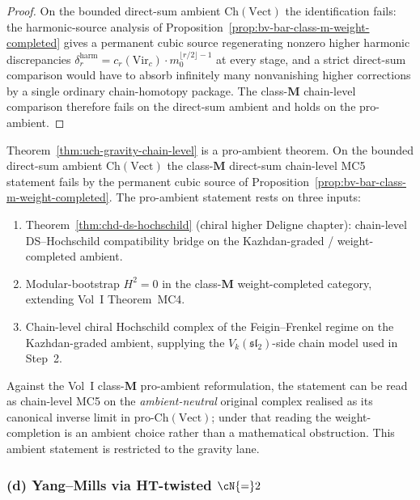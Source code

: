 \begin{proof}
On the bounded direct-sum ambient $\mathrm{Ch}(\mathrm{Vect})$ the
identification fails: the harmonic-source analysis of
Proposition~\ref{prop:bv-bar-class-m-weight-completed} gives a
permanent cubic source regenerating nonzero higher harmonic
discrepancies $\delta_r^{\mathrm{harm}} =
c_r(\mathrm{Vir}_c) \cdot m_0^{\lfloor r/2 \rfloor - 1}$ at every
stage, and a strict direct-sum comparison would have to absorb
infinitely many nonvanishing higher corrections by a single ordinary
chain-homotopy package. The class-$\mathbf M$ chain-level comparison
therefore fails on the direct-sum ambient and holds on the
pro-ambient.
\end{proof}

\begin{remark}
\label{rem:uch-gravity-chain-level-promotion}
Theorem~\ref{thm:uch-gravity-chain-level} is a pro-ambient theorem.
On the bounded direct-sum ambient $\mathrm{Ch}(\mathrm{Vect})$ the
class-$\mathbf M$ direct-sum chain-level MC5 statement fails by the
permanent cubic source of
Proposition~\ref{prop:bv-bar-class-m-weight-completed}. The
pro-ambient statement rests on three inputs:
\begin{enumerate}
\item Theorem~\ref{thm:chd-ds-hochschild} (chiral higher Deligne
chapter): chain-level DS--Hochschild compatibility bridge on the
Kazhdan-graded / weight-completed ambient.
\item Modular-bootstrap $H^2 = 0$ in the class-$\mathbf M$
weight-completed category, extending Vol~I Theorem~MC4.
\item Chain-level chiral Hochschild complex of the Feigin--Frenkel
regime on the Kazhdan-graded ambient, supplying the
$V_k(\mathfrak{sl}_2)$-side chain model used in Step~2.
\end{enumerate}
Against the Vol~I class-$\mathbf M$ pro-ambient reformulation, the
statement can be read as chain-level MC5 on the
\emph{ambient-neutral} original complex realised as its canonical
inverse limit in
$\mathrm{pro}\text{-}\mathrm{Ch}(\mathrm{Vect})$; under that reading
the weight-completion is an ambient choice rather than a mathematical
obstruction. This ambient statement is restricted to the gravity lane.
\end{remark}

\subsubsection*{(d) Yang--Mills via HT-twisted $\cN{=}2$}

